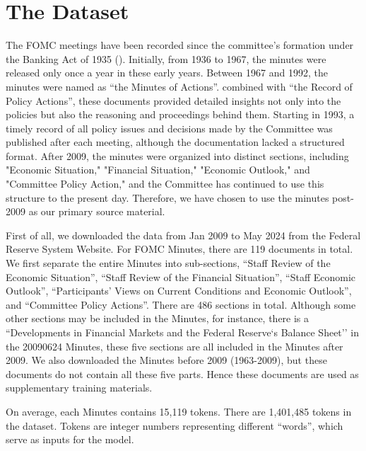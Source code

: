 \section{The Dataset}\label{ch2:sec:the dataset}

The FOMC meetings have been recorded since the committee's formation under the Banking Act of 1935 (\cite{todd2016corollary}). Initially, from 1936 to 1967, the minutes were released only once a year in these early years. Between 1967 and 1992, the minutes were named as ``the Minutes of Actions''. combined with ``the Record of Policy Actions'', these documents provided detailed insights not only into the policies but also the reasoning and proceedings behind them. Starting in 1993, a timely record of all policy issues and decisions made by the Committee was published after each meeting, although the documentation lacked a structured format. After 2009, the minutes were organized into distinct sections, including "Economic Situation," "Financial Situation," "Economic Outlook," and "Committee Policy Action," and the Committee has continued to use this structure to the present day. Therefore, we have chosen to use the minutes post-2009 as our primary source material.



First of all, we downloaded the data from Jan 2009 to May 2024 from the Federal Reserve System Website. For FOMC Minutes, there are 119 documents in total. We first separate the entire Minutes into sub-sections, ``Staff Review of the Economic Situation'', ``Staff Review of the Financial Situation'', ``Staff Economic Outlook'', ``Participants' Views on Current Conditions and Economic Outlook'', and ``Committee Policy Actions''. There are 486 sections in total. Although some other sections may be included in the Minutes, for instance, there is a ``Developments in Financial Markets and the Federal Reserve`s Balance Sheet'' in the 20090624 Minutes, these five sections are all included in the Minutes after 2009. We also downloaded the Minutes before 2009 (1963-2009), but these documents do not contain all these five parts. Hence these documents are used as supplementary training materials. 

On average, each Minutes contains 15,119 tokens. There are 1,401,485 tokens in the dataset. Tokens are integer numbers representing different ``words'', which serve as inputs for the model. 

